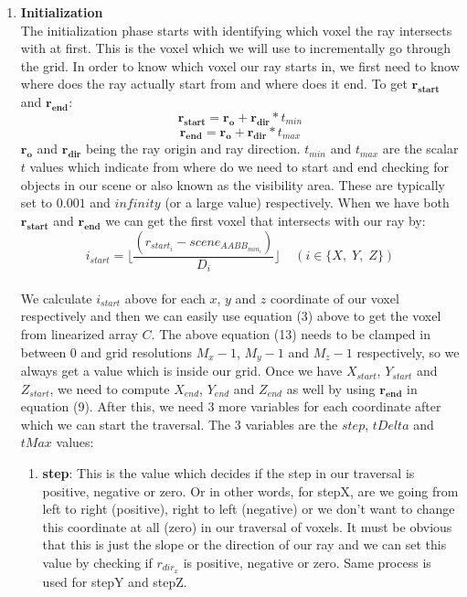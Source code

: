 \documentclass[11pt,a4paper]{article}
\begin{document}
\begin{enumerate}
\item \textbf{Initialization}
\\ The initialization phase starts with identifying which voxel the ray intersects with at first. This is the voxel which we will use to incrementally go through the grid. In order to know which voxel our ray starts in, we first need to know where does the ray actually start from and where does it end. To get $\boldsymbol{r_{start}}$ and $\boldsymbol{r_{end}}$:
\begin{equation}
\boldsymbol{r_{start}} = \boldsymbol{r_{o}} + \boldsymbol{r_{dir}} * t_{min}
\end{equation}
\begin{equation}
\boldsymbol{r_{end}} = \boldsymbol{r_{o}} + \boldsymbol{r_{dir}} * t_{max}
\end{equation}
$\boldsymbol{r_{o}}$ and $\boldsymbol{r_{dir}}$ being the ray origin and ray direction. $t_{min}$ and $t_{max}$ are the scalar $t$ values which indicate from where do we need to start and end checking for objects in our scene or also known as the visibility area. These are typically set to $0.001$ and $infinity$ (or a large value) respectively. When we have both $\boldsymbol{r_{start}}$ and $\boldsymbol{r_{end}}$ we can get the first voxel that intersects with our ray by:
 \begin{equation}
i_{start} = \lfloor \frac{(r_{start_{i}} - scene_{AABB_{min_{i}}})}{D_{i}} \rfloor \;\;\;\; (i \in \{X,\;Y,\;Z\})
\end{equation}
\\
We calculate $i_{start}$ above for each $x$, $y$ and $z$ coordinate of our voxel respectively and then we can easily use equation (3) above to get the voxel from linearized array $C$. The above equation (13) needs to be clamped in between $0$ and grid resolutions $M_{x} - 1$, $M_{y} - 1$ and $M_{z} - 1$ respectively, so we always get a value which is inside our grid. Once we have $X_{start}$, $Y_{start}$ and $Z_{start}$, we need to compute $X_{end}$, $Y_{end}$ and $Z_{end}$ as well by using $\boldsymbol{r_{end}}$ in equation (9). After this, we need 3 more variables for each coordinate after which we can start the traversal. The 3 variables are the $step$, $tDelta$ and $tMax$ values:
\begin{enumerate}
\item \textbf{step}: This is the value which decides if the step in our traversal is positive, negative or zero. Or in other words, for stepX, are we going from left to right (positive), right to left (negative) or we don't want to change this coordinate at all (zero) in our traversal of voxels. It must be obvious that this is just the slope or the direction of our ray and we can set this value by checking if $r_{dir_{x}}$ is positive, negative or zero. Same process is used for stepY and stepZ.

\end{enumerate}
\end{enumerate}
\end{document}
